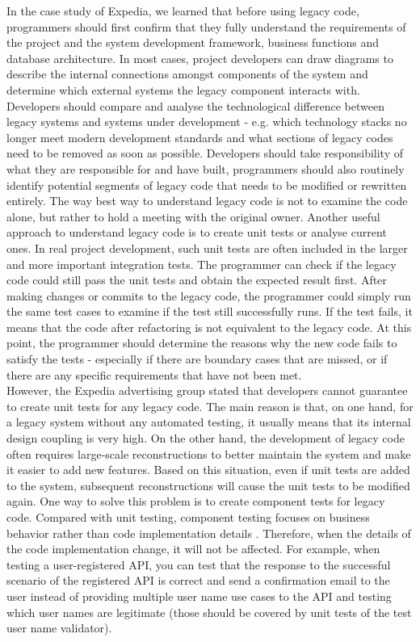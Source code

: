 \documentclass[11pt]{article}
\begin{document}
In the case study of Expedia, we learned that before using legacy code, programmers should first confirm that they fully understand the requirements of the project and the system development framework, business functions and database architecture. In most cases, project developers can draw diagrams to describe the internal connections amongst components of the system and determine which external systems the legacy component interacts with.  Developers should compare and analyse the technological difference between legacy systems and systems under development - e.g. which technology stacks no longer meet modern development standards and what sections of legacy codes need to be removed as soon as possible. Developers should take responsibility of what they are responsible for and have built, programmers should also routinely identify potential segments of legacy code that needs to be modified or rewritten entirely. The way best way to understand legacy code is not to examine the code alone, but rather to hold a meeting with the original owner. Another useful approach to understand legacy code is to create unit tests or analyse current ones. In real project development, such unit tests are often included in the larger and more important integration tests. The programmer can check if the legacy code could still pass the unit tests and obtain the expected result first. After making changes or commits to the legacy code, the programmer could simply run the same test cases to examine if the test still successfully runs. If the test fails, it means that the code after refactoring is not equivalent to the legacy code. At this point, the programmer should determine the reasons why the new code fails to satisfy the tests - especially if there are boundary cases that are missed, or if there are any specific requirements that have not been met.\\[10px]
However, the Expedia advertising group stated that developers cannot guarantee to create unit tests for any legacy code. The main reason is that, on one hand, for a legacy system without any automated testing, it usually means that its internal design coupling is very high. On the other hand, the development of legacy code often requires large-scale reconstructions to better maintain the system and make it easier to add new features. Based on this situation, even if unit tests are added to the system, subsequent reconstructions will cause the unit tests to be modified again. One way to solve this problem is to create component tests for legacy code. Compared with unit testing, component testing focuses on business behavior rather than code implementation details \cite{no3}. Therefore, when the details of the code implementation change, it will not be affected. For example, when testing a user-registered API, you can test that the response to the successful scenario of the registered API is correct and send a confirmation email to the user instead of providing multiple user name use cases to the API and testing which user names are legitimate (those should be covered by unit tests of the test user name validator).\\[10px]
\end{document}
